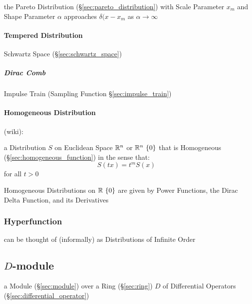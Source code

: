 {the Pareto Distribution (\S\ref{sec:pareto_distribution}) with Scale Parameter
$x_m$ and Shape Parameter $\alpha$ approaches $\delta(x - x_m$ as
$\alpha \to \infty$



\paragraph{Tempered Distribution}\label{sec:tempered_distribution}\hfill

\fist Schwartz Space (\S\ref{sec:schwartz_space})



\subparagraph{Dirac Comb}\label{sec:dirac_comb}\hfill

Impulse Train (Sampling Function \S\ref{sec:impulse_train})



\paragraph{Homogeneous Distribution}\label{sec:homogeneous_distribution}\hfill

(wiki):

a Distribution $S$ on Euclidean Space $\mathbb{R}^n$ or $\mathbb{R}^n \ \{0\}$ that is
Homogeneous (\S\ref{sec:homogeneous_function}) in the sense that:
\[
  S(tx) = t^mS(x)
\]
for all $t > 0$

Homogeneous Distributions on $\reals \ \{0\}$ are given by Power Functions,
the Dirac Delta Function, and its Derivatives



\subsubsection{Hyperfunction}\label{sec:hyperfunction}

can be thought of (informally) as Distributions of Infinite Order



\subsection{$D$-module}\label{sec:d_module}

a Module (\S\ref{sec:module}) over a Ring (\S\ref{sec:ring}) $D$ of Differential
Operators (\S\ref{sec:differential_operator})

}
